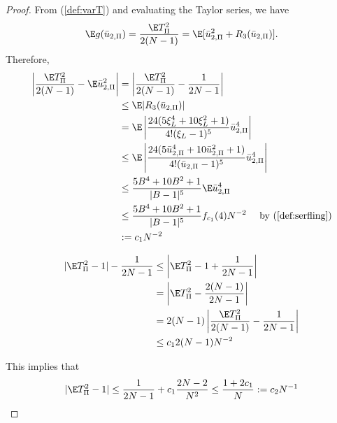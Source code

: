 \begin{proof}
  From (\ref{def:varT}) and evaluating the Taylor series, we have
  \begin{equation*}
    \E g(\bar{u}_{2,\Pi}) = \frac{\E T_{\Pi}^2}{2(N-1)} = \E[\bar{u}_{2,\Pi}^2 + R_3(\bar{u}_{2,\Pi})].
  \end{equation*}
  Therefore,
  \begin{align*}
    \left | \frac{\E T_{\Pi}^2}{2(N-1)} - \E \bar{u}_{2,\Pi}^2 \right |
    &= \left | \frac{\E T_{\Pi}^2}{2(N-1)} - \frac{1}{2N-1} \right | \\
    &\leq  \E |R_3(\bar{u}_{2,\Pi})| \\
    &= \E \left | \frac{24(5\xi_L^4 + 10 \xi_L^2 +
        1)}{4!(\xi_L-1)^5}\bar{u}_{2,\Pi}^4 \right | \\
    &\leq \E \left | \frac{24(5\bar{u}_{2,\Pi}^4 + 10 \bar{u}_{2,\Pi}^2 +
        1)}{4!(\bar{u}_{2,\Pi}-1)^5}\bar{u}_{2,\Pi}^4 \right | \\
    &\leq \frac{5B^4+10B^2+1}{|B-1|^5} \E \bar{u}_{2,\Pi}^4 \\
    &\leq \frac{5B^4+10B^2+1}{|B-1|^5} f_{c_1}(4) N^{-2} \quad \text{
      by } (\ref{def:serfling}) \\
    &:= c_1 N^{-2}
  \end{align*}

  \begin{align*}
    |\E T_{\Pi}^2 - 1| - \frac{1}{2N-1}
    &\leq \left | \E T_{\Pi}^2 - 1 + \frac{1}{2N-1} \right | \\
    &= \left | \E T_{\Pi}^2 - \frac{2(N-1)}{2N-1} \right | \\
    &= 2(N-1) \left | \frac{\E T_{\Pi}^2}{2(N-1)} - \frac{1}{2N-1} \right | \\
    &\leq c_1 2(N-1)N^{-2}
  \end{align*}

  This implies that
  \begin{equation*}
    |\E T_{\Pi}^2 - 1| \leq \frac{1}{2N-1} + c_1 \frac{2N-2}{N^2} \leq
    \frac{1 + 2c_1}{N} := c_2 N^{-1}
  \end{equation*}
\end{proof}

